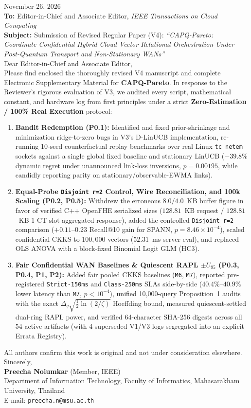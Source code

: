 \documentclass[11pt]{article}
\begin{document}
\noindent November 26, 2026\\[1em]
\textbf{To:} Editor-in-Chief and Associate Editor, \textit{IEEE Transactions on Cloud Computing}\\
\textbf{Subject:} Submission of Revised Regular Paper (V4): \textit{``CAPQ-Pareto: Coordinate-Confidential Hybrid Cloud Vector-Relational Orchestration Under Post-Quantum Transport and Non-Stationary WANs''}\\[1em]
Dear Editor-in-Chief and Associate Editor,\\[0.6em]
Please find enclosed the thoroughly revised V4 manuscript and complete Electronic Supplementary Material for \textbf{CAPQ-Pareto}. In response to the Reviewer's rigorous evaluation of V3, we audited every script, mathematical constant, and hardware log from first principles under a strict \textbf{Zero-Estimation / 100\% Real Execution} protocol:
\begin{enumerate}
    \item \textbf{Bandit Redemption (P0.1):} Identified and fixed prior-shrinkage and minimization ridge-to-zero bugs in V3's D-LinUCB implementation, re-running 10-seed counterfactual replay benchmarks over real Linux \texttt{tc netem} sockets against a single global fixed baseline and stationary LinUCB ($-39.8\%$ dynamic regret under unannounced link-loss inversions, $p=0.00195$, while candidly reporting parity on stationary/observable-EWMA links).
    \item \textbf{Equal-Probe \texttt{Disjoint r=2} Control, Wire Reconciliation, and 100k Scaling (P0.2, P0.5):} Withdrew the erroneous $8.0/4.0$~KB buffer figure in favor of verified C++ OpenFHE serialized sizes ($128.81$~KB request / $128.81$~KB 1-CT slot-aggregated response), added the controlled \texttt{Disjoint r=2} comparison ($+0.11\text{--}0.23$ Recall@10 gain for SPANN, $p=8.46\times 10^{-4}$), scaled confidential CKKS to $100,000$ vectors ($52.31$~ms server eval), and replaced OLS ANOVA with a block-fixed Binomial Logit GLM (HC3).
    \item \textbf{Fair Confidential WAN Baselines \& Quiescent RAPL $\pm U_{95}$ (P0.3, P0.4, P1, P2):} Added fair pooled CKKS baselines (\texttt{M6}, \texttt{M7}), reported pre-registered \texttt{Strict-150ms} and \texttt{Class-250ms} SLAs side-by-side ($40.4\%\text{--}40.9\%$ lower latency than \texttt{M7}, $p<10^{-4}$), unified 10,000-query Proposition~1 audits with the exact $\Delta_q\sqrt{\tfrac{1}{2}\ln(2/\zeta)}$ Hoeffding bound, measured quiescent-settled dual-ring RAPL power, and verified 64-character SHA-256 digests across all 54 active artifacts (with 4 superseded V1/V3 logs segregated into an explicit Errata Registry).
\end{enumerate}
All authors confirm this work is original and not under consideration elsewhere.\\[1em]
Sincerely,\\[0.6em]
\textbf{Preecha Noiumkar} (Member, IEEE)\\
Department of Information Technology, Faculty of Informatics, Mahasarakham University, Thailand\\
E-mail: \texttt{preecha.n@msu.ac.th}
\end{document}
